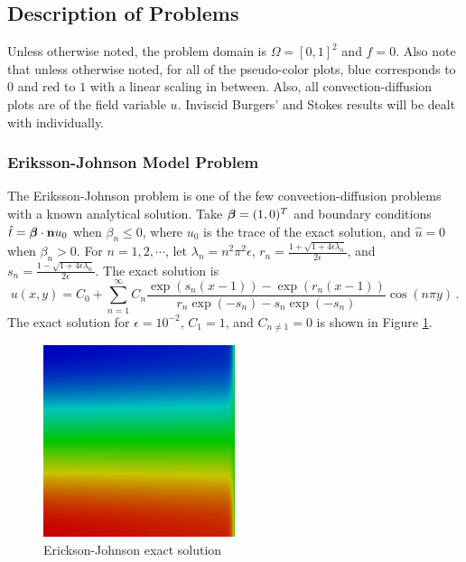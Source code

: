 \documentclass[Proposal.tex]{subfiles}
\begin{document}
\subsection{Description of Problems}\label{sec:problemDescriptions}
Unless otherwise noted, the problem domain is $\Omega=[0,1]^2$ and $f=0$. Also
note that unless otherwise noted, for all of the
pseudo-color plots, blue corresponds to $0$ and red to $1$ with a linear
scaling in between. Also, all convection-diffusion plots are of the field variable $u$.
Inviscid Burgers' and Stokes results will be dealt with individually.

\subsubsection{Eriksson-Johnson Model Problem}
The Eriksson-Johnson problem is one of the few convection-diffusion problems
with a known analytical solution. Take
$\boldsymbol\beta=(1,0)^T$ and boundary conditions $\hat t=\boldsymbol\beta\cdot\mathbf{n} u_0$ when
$\beta_n\le0$, where $u_0$ is the trace of the exact solution, and $\hat u=0$
when $\beta_n>0$. For
$n=1,2,\cdots$, let
$\lambda_n=n^2\pi^2\epsilon$,
$r_n=\frac{1+\sqrt{1+4\epsilon\lambda_n}}{2\epsilon}$, and
$s_n=\frac{1-\sqrt{1+4\epsilon\lambda_n}}{2\epsilon}$. The exact solution
is
\begin{equation}
u(x,y)=C_0+\sum_{n=1}^\infty C_n\frac{\exp(s_n(x-1))-\exp(r_n(x-1))}
{r_n\exp(-s_n)-s_n\exp(-s_n)}\cos(n\pi y)\,.
\label{eq:ericksonExact}
\end{equation}
The exact solution for $\epsilon=10^{-2}$, $C_1=1$, and $C_{n\neq1}=0$ is
shown in Figure \ref{fig:erickson}.

\begin{figure}[p]
\centering
\includegraphics[width=0.5\textwidth]{figs/Erickson/exact.png}
\caption{Erickson-Johnson exact solution}
\label{fig:erickson}
\end{figure}
\end{document}
